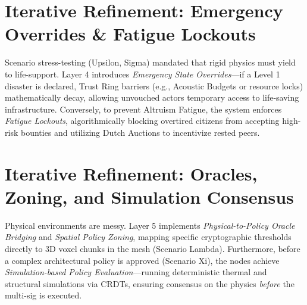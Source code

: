 \section{Iterative Refinement: Emergency Overrides \& Fatigue Lockouts}
Scenario stress-testing (Upsilon, Sigma) mandated that rigid physics must yield to life-support. Layer 4 introduces \textit{Emergency State Overrides}—if a Level 1 disaster is declared, Trust Ring barriers (e.g., Acoustic Budgets or resource locks) mathematically decay, allowing unvouched actors temporary access to life-saving infrastructure. Conversely, to prevent Altruism Fatigue, the system enforces \textit{Fatigue Lockouts}, algorithmically blocking overtired citizens from accepting high-risk bounties and utilizing Dutch Auctions to incentivize rested peers.

\section{Iterative Refinement: Oracles, Zoning, and Simulation Consensus}
Physical environments are messy. Layer 5 implements \textit{Physical-to-Policy Oracle Bridging} and \textit{Spatial Policy Zoning}, mapping specific cryptographic thresholds directly to 3D voxel chunks in the mesh (Scenario Lambda). Furthermore, before a complex architectural policy is approved (Scenario Xi), the nodes achieve \textit{Simulation-based Policy Evaluation}—running deterministic thermal and structural simulations via CRDTs, ensuring consensus on the physics \textit{before} the multi-sig is executed.
